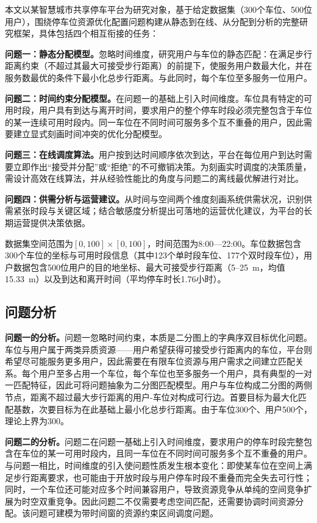 \documentclass[12pt,a4paper]{ctexart}
\begin{document}
本文以某智慧城市共享停车平台为研究对象，基于给定数据集（300个车位、500位用户），围绕停车位资源优化配置问题构建从静态到在线、从分配到分析的完整研究框架，具体包括四个相互衔接的任务：

\textbf{问题一：静态分配模型。}忽略时间维度，研究用户与车位的静态匹配：在满足步行距离约束（不超过其最大可接受步行距离）的前提下，使服务用户数最大化，并在服务数最优的条件下最小化总步行距离。与此同时，每个车位至多服务一位用户。

\textbf{问题二：时间约束分配模型。}在问题一的基础上引入时间维度。车位具有特定的可用时段，用户具有到达与离开时间，要求用户的整个停车时段必须完整包含于车位的某一连续可用时段内。同一车位在不同时间可服务多个互不重叠的用户，因此需要建立显式刻画时间冲突的优化分配模型。

\textbf{问题三：在线调度算法。}用户按到达时间顺序依次到达，平台在每位用户到达时需要立即作出``接受并分配''或``拒绝''的不可撤销决策。为刻画实时调度的决策质量，需设计高效在线算法，并从经验性能比的角度与问题二的离线最优解进行对比。

\textbf{问题四：供需分析与运营建议。}从时间与空间两个维度刻画系统供需状况，识别供需紧张时段与关键区域；结合敏感度分析提出可落地的运营优化建议，为平台的长期运营提供决策依据。

数据集空间范围为$[0,100]\times[0,100]$，时间范围为8:00—22:00。车位数据包含300个车位的坐标与可用时段信息（其中123个单时段车位、177个双时段车位），用户数据包含500位用户的目的地坐标、最大可接受步行距离（5--25~m，均值15.33~m）以及到达和离开时间（平均停车时长1.76小时）。

\subsection{问题分析}

\textbf{问题一的分析。}问题一忽略时间约束，本质是二分图上的字典序双目标优化问题。车位与用户属于两类异质资源——用户希望获得可接受步行距离内的车位，平台则希望尽可能服务更多用户，因此需要在有限车位资源与用户需求之间建立匹配关系。每个用户至多占用一个车位，每个车位也至多服务一个用户，具有典型的一对一匹配特征，因此可将问题抽象为二分图匹配模型。用户与车位构成二分图的两侧节点，距离不超过最大步行距离的用户-车位对构成可行边。首要目标为最大化匹配基数，次要目标为在此基础上最小化总步行距离。由于车位300个、用户500个，理论上界为300。

\textbf{问题二的分析。}问题二在问题一基础上引入时间维度，要求用户的停车时段完整包含在车位的某一可用时段内，且同一车位在不同时间可服务多个互不重叠的用户。与问题一相比，时间维度的引入使问题性质发生根本变化：即使某车位在空间上满足步行距离要求，也可能由于开放时段与用户停车时段不重叠而完全失去可行性；同时，一个车位还可能对应多个时间兼容用户，导致资源竞争从单纯的空间竞争扩展为时空双重竞争。因此问题二不仅需要考虑空间匹配，还需要协调时间资源分配。该问题可建模为带时间窗的资源约束区间调度问题。
\end{document}
